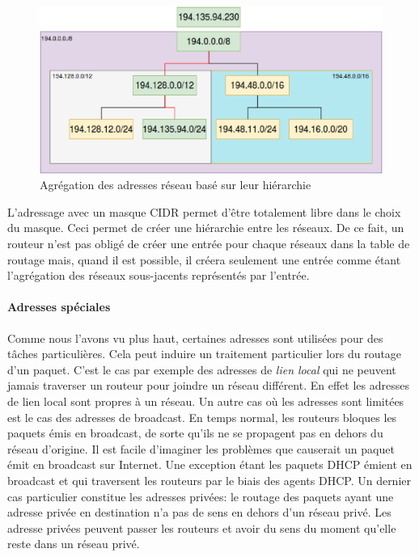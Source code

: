 \begin{figure}[h]
\centering
\includegraphics[width=15cm]{./pics/routagecidr.eps}
\caption{Agrégation des adresses réseau basé sur leur hiérarchie}
\label{fig:routcidr}
\end{figure}

L'adressage avec un masque CIDR permet d'être totalement libre dans le choix du
masque. Ceci permet de créer une hiérarchie entre les réseaux. De ce fait,
un routeur n'est pas obligé de créer une entrée pour chaque réseaux dans la
table de routage mais, quand il est possible, il créera seulement une entrée
comme étant l'agrégation des réseaux sous-jacents représentés par l'entrée.



\paragraph{Adresses spéciales}


Comme nous l'avons vu plus haut, certaines adresses sont utilisées pour des
tâches particulières. Cela peut induire un traitement particulier lors du routage
d'un paquet.  C'est le cas par exemple des adresses de {\it lien local} qui ne
peuvent jamais traverser un routeur pour joindre un réseau différent. En effet
les adresses de lien local sont propres à un réseau.
Un autre cas où les adresses sont limitées est le cas des adresses de broadcast.
En temps normal, les routeurs bloques les paquets émis en broadcast, de sorte qu'ils ne se propagent pas en dehors du réseau d'origine. Il est facile d'imaginer les problèmes que causerait un paquet émit en broadcast sur Internet. Une exception étant les paquets DHCP émient en broadcast et qui traversent les routeurs par le biais des agents DHCP.
Un dernier cas particulier constitue les adresses privées: le routage des paquets ayant une adresse privée en destination n'a pas de sens en dehors d'un réseau privé. Les adresse privées peuvent passer les routeurs et avoir du sens du moment qu'elle reste dans un réseau privé.

